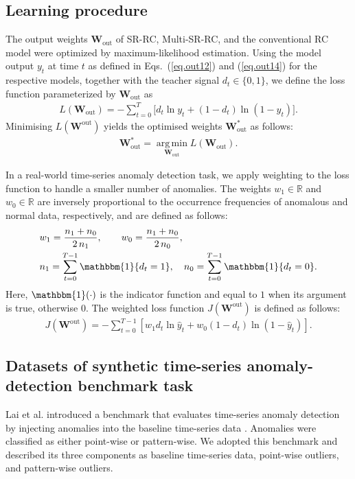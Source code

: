 \documentclass[pdflatex,sn-nature]{sn-jnl}
\theoremstyle{thmstyleone}%
\theoremstyle{thmstyletwo}%
\theoremstyle{thmstylethree}%
\begin{document}
\subsection*{Learning procedure}
The output weights \(\mathbf{W}_{\mathrm{out}}\) of SR-RC, Multi-SR-RC, and the conventional RC model were optimized by maximum-likelihood estimation.
Using the model output $y_t$ at time $t$ as defined in Eqs.~(\ref{eq.out12}) and (\ref{eq.out14}) for the respective models, together with the teacher signal $d_t \in \{0,1\}$, we define the loss function parameterized by $\mathbf{W}_{\mathrm{out}}$ as 
\begin{align}
L(\mathbf{W}_{\mathrm{out}}) 
= - \sum_{t=0}^{T} \bigl[ d_t \ln y_t + (1 - d_t) \ln (1 - y_t) \bigr].
\end{align}
Minimising \(L(\mathbf{W}^{\mathrm{out}})\) yields the optimised weights \(\mathbf{W}_{\mathrm{out}}^\ast\) as follows: 
\begin{align}
\mathbf{W}_{\mathrm{out}}^\ast 
= \operatorname*{arg\,min}_{\mathbf{W}_{\mathrm{out}}} L(\mathbf{W}_{\mathrm{out}}).
\end{align}

In a real-world time-series anomaly detection task, we apply weighting to the loss function to handle a smaller number of anomalies.
The weights $w_1\in \mathbb{R}$ and $w_0 \in \mathbb{R}$ are inversely proportional to the occurrence frequencies of anomalous and normal data, respectively, and are defined as follows:
\begin{align}
&w_1=\frac{n_1+n_0}{2\,n_1},\qquad 
w_0=\frac{n_1+n_0}{2\,n_0},\qquad\\
&n_1=\sum_{t=0}^{T-1}\mathbbm{1}\{d_t=1\},\quad n_0=\sum_{t=0}^{T-1}\mathbbm{1}\{d_t=0\}.
\end{align}
Here, $\mathbbm{1}(\cdot)$ is the indicator function and equal to $1$ when its argument is true, otherwise $0$.
The weighted loss function $J(\boldsymbol{W}^{\mathrm{out}})$ is defined as follows:
\begin{align}
    J(\boldsymbol{W}^{\mathrm{out}})=-\sum_{t=0}^{T-1}\left[w_1 d_t \ln \hat{y}_t + w_0 (1-d_t)\ln(1-\hat{y}_t)\right].
\end{align}

\subsection*{Datasets of synthetic time-series anomaly-detection benchmark task}
Lai et al. introduced a benchmark that evaluates time-series anomaly detection by injecting anomalies into the baseline time-series data \cite{Lai2021RevisitingTS}. 
Anomalies were classified as either point-wise or pattern-wise. 
We adopted this benchmark and described its three components as baseline time-series data, point-wise outliers, and pattern-wise outliers.
\end{document}

